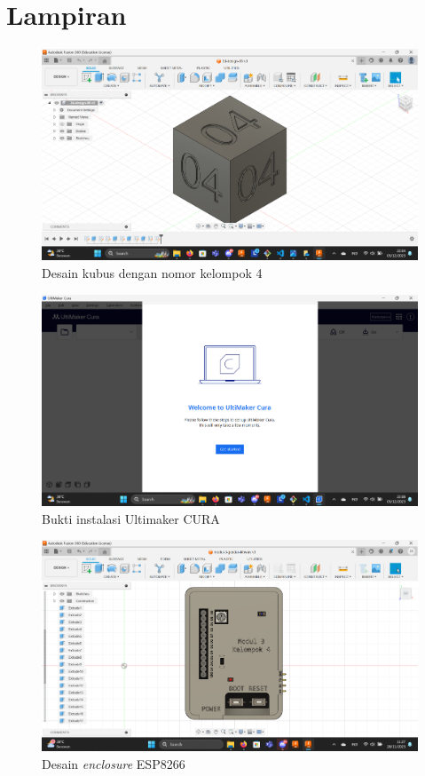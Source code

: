 \section*{Lampiran} %

\begin{figure}[htbp]
  \centering
  \includegraphics[width=0.8\linewidth]{img/kubus.png}
  \caption{Desain kubus dengan nomor kelompok 4} 
  \label{fig:cube}
\end{figure}

\begin{figure}[htbp]
  \centering
  \includegraphics[width=0.8\linewidth]{img/ultimaker.png}
  \caption{Bukti instalasi Ultimaker CURA} 
  \label{fig:ultimaker}
\end{figure}

\begin{figure}[htbp]
  \centering
  \includegraphics[width=0.8\linewidth]{img/enclosure-atas.png}
  \caption{Desain \textit{enclosure} ESP8266} 
  \label{fig:enclosure-atas}
\end{figure}

